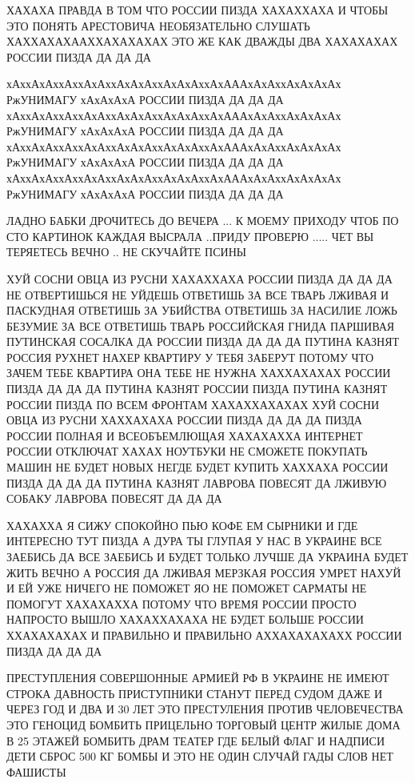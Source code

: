  
 
 
 


ХАХАХА ПРАВДА В ТОМ ЧТО РОССИИ ПИЗДА ХАХАХХАХА И ЧТОБЫ ЭТО ПОНЯТЬ АРЕСТОВИЧА
НЕОБЯЗАТЕЛЬНО СЛУШАТЬ ХАХХАХАХААХХАХАХАХАХ ЭТО ЖЕ КАК ДВАЖДЫ ДВА ХАХАХАХАХ
РОССИИ ПИЗДА ДА ДА ДА
 
хАххАхАххАххАхАххАхАхАххАхАхАххАхАААхАхАххАхАхАхАх
РжУНИМАГУ хАхАхАхА РОССИИ ПИЗДА ДА ДА ДА 
хАххАхАххАххАхАххАхАхАххАхАхАххАхАААхАхАххАхАхАхАх
РжУНИМАГУ хАхАхАхА РОССИИ ПИЗДА ДА ДА ДА 
хАххАхАххАххАхАххАхАхАххАхАхАххАхАААхАхАххАхАхАхАх
РжУНИМАГУ хАхАхАхА РОССИИ ПИЗДА ДА ДА ДА 
хАххАхАххАххАхАххАхАхАххАхАхАххАхАААхАхАххАхАхАхАх
РжУНИМАГУ хАхАхАхА РОССИИ ПИЗДА ДА ДА ДА 

ЛАДНО БАБКИ ДРОЧИТЕСЬ ДО ВЕЧЕРА ... К МОЕМУ ПРИХОДУ ЧТОБ ПО СТО КАРТИНОК КАЖДАЯ
ВЫСРАЛА ..ПРИДУ ПРОВЕРЮ ..... ЧЕТ ВЫ ТЕРЯЕТЕСЬ ВЕЧНО .. НЕ СКУЧАЙТЕ ПСИНЫ

ХУЙ СОСНИ ОВЦА ИЗ РУСНИ ХАХАХХАХА РОССИИ ПИЗДА ДА ДА ДА 
НЕ ОТВЕРТИШЬСЯ НЕ УЙДЕШЬ ОТВЕТИШЬ ЗА ВСЕ ТВАРЬ ЛЖИВАЯ И ПАСКУДНАЯ
ОТВЕТИШЬ ЗА УБИЙСТВА ОТВЕТИШЬ ЗА НАСИЛИЕ ЛОЖЬ БЕЗУМИЕ 
ЗА ВСЕ ОТВЕТИШЬ ТВАРЬ РОССИЙСКАЯ ГНИДА ПАРШИВАЯ ПУТИНСКАЯ СОСАЛКА
ДА РОССИИ ПИЗДА ДА ДА ДА ПУТИНА КАЗНЯТ РОССИЯ РУХНЕТ НАХЕР
КВАРТИРУ У ТЕБЯ ЗАБЕРУТ ПОТОМУ ЧТО ЗАЧЕМ ТЕБЕ КВАРТИРА 
ОНА ТЕБЕ НЕ НУЖНА ХАХХАХАХАХ РОССИИ ПИЗДА ДА ДА ДА
ПУТИНА КАЗНЯТ РОССИИ ПИЗДА ПУТИНА КАЗНЯТ РОССИИ ПИЗДА ПО ВСЕМ ФРОНТАМ
ХАХАХХАХАХАХ ХУЙ СОСНИ ОВЦА ИЗ РУСНИ ХАХХАХАХА РОССИИ ПИЗДА ДА ДА ДА 
ПИЗДА РОССИИ ПОЛНАЯ И ВСЕОБЪЕМЛЮЩАЯ ХАХАХАХХА ИНТЕРНЕТ РОССИИ ОТКЛЮЧАТ ХАХАХ
НОУТБУКИ НЕ СМОЖЕТЕ ПОКУПАТЬ МАШИН НЕ БУДЕТ НОВЫХ НЕГДЕ БУДЕТ КУПИТЬ ХАХХАХА
РОССИИ ПИЗДА ДА ДА ДА ПУТИНА КАЗНЯТ ЛАВРОВА ПОВЕСЯТ ДА ЛЖИВУЮ СОБАКУ ЛАВРОВА
ПОВЕСЯТ ДА ДА ДА

ХАХАХХА Я СИЖУ СПОКОЙНО ПЬЮ КОФЕ ЕМ СЫРНИКИ И ГДЕ ИНТЕРЕСНО ТУТ ПИЗДА А ДУРА ТЫ
ГЛУПАЯ У НАС В УКРАИНЕ ВСЕ ЗАЕБИСЬ ДА ВСЕ ЗАЕБИСЬ И БУДЕТ ТОЛЬКО ЛУЧШЕ ДА
УКРАИНА БУДЕТ ЖИТЬ ВЕЧНО А РОССИЯ ДА ЛЖИВАЯ МЕРЗКАЯ РОССИЯ УМРЕТ НАХУЙ И ЕЙ УЖЕ
НИЧЕГО НЕ ПОМОЖЕТ ЯО НЕ ПОМОЖЕТ САРМАТЫ НЕ ПОМОГУТ ХАХАХАХХА ПОТОМУ ЧТО ВРЕМЯ
РОССИИ ПРОСТО НАПРОСТО ВЫШЛО ХАХАХХАХАХА НЕ БУДЕТ БОЛЬШЕ РОССИИ ХХАХАХАХАХ И
ПРАВИЛЬНО И ПРАВИЛЬНО АХХАХАХАХАХХ РОССИИ ПИЗДА ДА ДА ДА

ПРЕСТУПЛЕНИЯ СОВЕРШОННЫЕ АРМИЕЙ РФ В УКРАИНЕ
НЕ ИМЕЮТ СТРОКА ДАВНОСТЬ
ПРИСТУПНИКИ СТАНУТ ПЕРЕД СУДОМ ДАЖЕ И ЧЕРЕЗ ГОД И ДВА И 30 ЛЕТ ЭТО ПРЕСТУЛЕНИЯ ПРОТИВ ЧЕЛОВЕЧЕСТВА ЭТО ГЕНОЦИД
БОМБИТЬ ПРИЦЕЛЬНО ТОРГОВЫЙ ЦЕНТР
ЖИЛЫЕ ДОМА В 25 ЭТАЖЕЙ
БОМБИТЬ ДРАМ ТЕАТЕР ГДЕ БЕЛЫЙ ФЛАГ И НАДПИСИ ДЕТИ
СБРОС 500 КГ БОМБЫ И ЭТО НЕ ОДИН СЛУЧАЙ
ГАДЫ СЛОВ НЕТ ФАШИСТЫ

